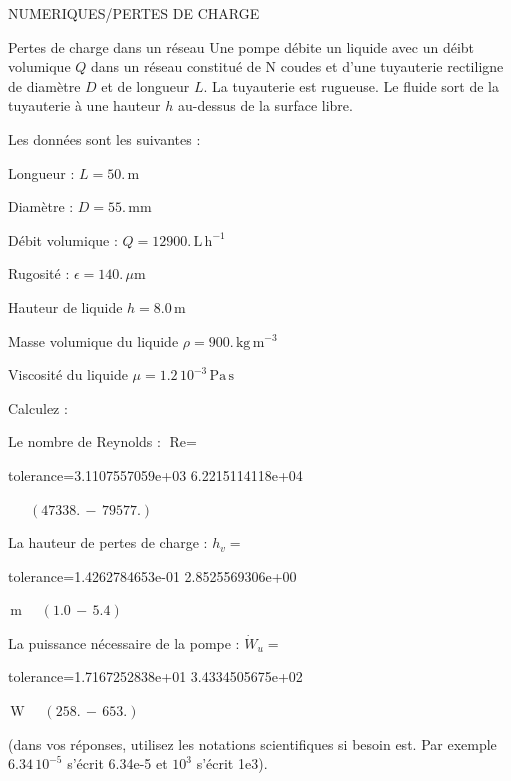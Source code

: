 \documentclass[12pt]{article}
\begin{document}
\begin{quiz}{NUMERIQUES/PERTES DE CHARGE} 

 \begin{cloze}{Pertes de charge dans un réseau} 
Une pompe débite un liquide avec un déibt volumique $Q$ dans un réseau constitué de N coudes et d'une tuyauterie rectiligne de diamètre $D$ et de longueur $L$. La tuyauterie est rugueuse. Le fluide sort de la tuyauterie à une hauteur $h$ au-dessus de la surface libre.

Les données sont les suivantes :

Longueur : $L = 50.\,  \mathrm{m} $

Diamètre : $D = 55.\,  \mathrm{mm} $

Débit volumique : $Q = 12900.\,  \mathrm{L}\,  \mathrm{h}^{-1} $

Rugosité : $\epsilon = 140.\, \mu \mathrm{m} $

Hauteur de liquide $h = 8.0\,  \mathrm{m} $

Masse volumique du liquide $\rho = 900.\,  \mathrm{kg}\,  \mathrm{m}^{-3} $

Viscosité du liquide $\mu =  1.2 \, 10^{-3} \,  \mathrm{Pa}\,  \mathrm{s} $

 

Calculez :

 

Le nombre de Reynolds : $\text{Re} =  $
\begin{numerical}[points=1] 
\item[tolerance={3.1107557059e+03}] 6.2215114118e+04 
\end{numerical} 
 $\,$ 
 $ \quad (47338. \, - \, 79577.) $ 

La hauteur de pertes de charge : $h_v =  $
\begin{numerical}[points=1] 
\item[tolerance={1.4262784653e-01}] 2.8525569306e+00 
\end{numerical} 
 $\,  \mathrm{m}$ 
 $ \quad (1.0 \, - \, 5.4) $ 

La puissance nécessaire de la pompe : $\dot{W}_u =  $
\begin{numerical}[points=1] 
\item[tolerance={1.7167252838e+01}] 3.4334505675e+02 
\end{numerical} 
 $\,  \mathrm{W}$ 
 $ \quad (258. \, - \, 653.) $ 

(dans vos réponses, utilisez les notations scientifiques si besoin est. Par exemple $6.34\, 10^{-5}$ s'écrit 6.34e-5 et $10^{3}$ s'écrit 1e3).


\end{cloze}
\end{quiz}
\end{document}
